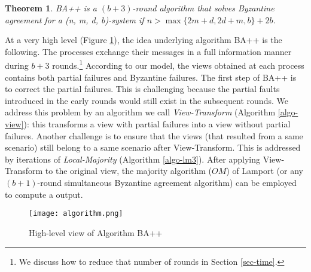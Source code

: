 \documentclass[11pt,conference,compsoc,onecolumn,romanappendices]{IEEEtran}
\newcommand{\tmem}[1]{{\em #1\/}}
\newtheorem{theorem}{Theorem}
\begin{document}
\begin{theorem}\label{thm-upper-bound}
  BA++ is a $(b+3)$-round algorithm that
  solves Byzantine agreement for a (n, m, d,
  b)-system if $n > \max \{2 m + d, 2 d + m, b\}+ 2
  b$.
\end{theorem}

At a very high level (Figure \ref{fig-algorithm}), the idea underlying algorithm BA++ is the following.
The processes exchange their messages in a full information manner
during $b+3$ rounds.\footnote{We discuss how to reduce that number of rounds
in Section \ref{sec-time}.}
According to our model, the views obtained at each process contains both partial failures and Byzantine failures. The first step of BA++ is to correct the partial failures.
This is challenging because the partial faults introduced in the early rounds would
still exist in the subsequent rounds.
We address this problem by an algorithm we call \tmem{View-Transform} (Algorithm \ref{algo-view}):
this transforms a view with partial failures into a view without partial failures.
Another challenge is to ensure that the views (that resulted from a same scenario)
still belong to a same scenario after View-Transform.
This is addressed by iterations of \tmem{Local-Majority} (Algorithm \ref{algo-lm3}).
After applying View-Transform to the original view, the majority algorithm ($O M$) of Lamport
{\cite{lamport1982byzantine}} (or any $(b+1)$-round simultaneous Byzantine
agreement algorithm) can be employed to compute a output.



\begin{figure}[p]
  \centering
  \texttt{[image: algorithm.png]}
  \caption{High-level view of Algorithm BA++\label{fig-algorithm}}
\end{figure}
\end{document}
